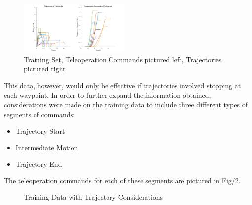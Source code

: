\documentclass[letterpaper, 10 pt, conference]{ieeeconf}  %
\begin{document}
\begin{figure}[ht]
    \includegraphics[width=0.48\textwidth]{images/training.png}
    \caption{Training Set, Teleoperation Commands pictured left, Trajectories pictured right}
    \label{fig:train}
\end{figure}

This data, however, would only be effective if trajectories involved stopping at each waypoint. In order to further expand the information obtained, considerations were made on the training data to include three different types of segments of commands:

\begin{itemize}
\item Trajectory Start
\item Intermediate Motion
\item Trajectory End
\end{itemize}

The teleoperation commands for each of these segments are pictured in Fig/\ref{fig:trainelab}.

\begin{figure}[h]
	\centering
	\caption{Training Data with Trajectory Considerations}
	\label{fig:trainelab}
\end{figure}
\end{document}
